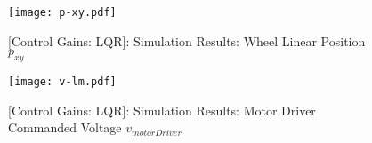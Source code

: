 \documentclass[crop=false,float=true,class=scrreprt]{standalone}
\begin{document}
\clearpage





\vspace*{\fill}
\begin{figure}[H]%
\centering%
\texttt{[image: p-xy.pdf]}%
\caption[{[Control Gains: LQR]: Simulation Results: Wheel Linear Position $p_{xy}$}]%
        {{[Control Gains: LQR]: Simulation Results: Wheel Linear Position $p_{xy}$%
          \label{FIG:controllerDesign:additionalDynamics:optimal:results:simulation:pXY}%
        }}%
\end{figure}
\vspace*{\fill}




\clearpage





\vspace*{\fill}
\begin{figure}[H]%
\centering%
\texttt{[image: v-lm.pdf]}%
\caption[{[Control Gains: LQR]: Simulation Results: Motor Driver Commanded Voltage $v_{motorDriver}$}]%
        {{[Control Gains: LQR]: Simulation Results: Motor Driver Commanded Voltage $v_{motorDriver}$%
          \label{FIG:controllerDesign:additionalDynamics:optimal:results:simulation:vMotorDriver}%
        }}%
\end{figure}
\vspace*{\fill}




\clearpage













\clearpage




\iffalse

\subsubsection{Pole-Placement}

Several pole-placement techniques also exist
\cite{REF:textbook:1995-vaccaro}.
This section is representative of future work with the system.

\subsubsubsection{Background}
\subsubsubsection{Simulation Implementation}
\subsubsubsection{Hardware Implementation}




\clearpage

\fi
\end{document}

